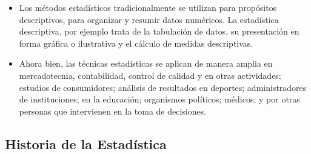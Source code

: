 \begin{itemize}
    \item Los m\'etodos estad\'isticos tradicionalmente se utilizan para prop\'ositos descriptivos, para organizar y resumir datos num\'ericos. La estad\'istica descriptiva, por ejemplo trata de la tabulaci\'on de datos, su presentaci\'on en forma gr\'afica o ilustrativa y el c\'alculo de medidas descriptivas.
    \item Ahora bien, las t\'ecnicas estad\'isticas se aplican de manera amplia en mercadotecnia, contabilidad, control de calidad y en otras actividades; estudios de consumidores; an\'alisis de resultados en deportes; administradores de instituciones; en la educaci\'on; organismos pol\'iticos; m\'edicos; y por otras personas que intervienen en la toma de decisiones.
\end{itemize}

\subsection{Historia de la Estad\'istica}

